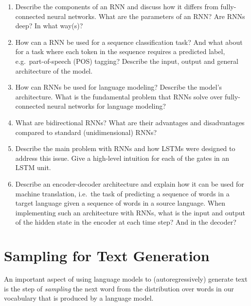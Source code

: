 \documentclass[11pt,a4paper]{article}
\begin{document}
\begin{enumerate}[label=(\alph*)]
    \item Describe the components of an RNN and discuss how it differs from
          fully-connected neural networks. What are the parameters of an RNN?
          Are RNNs deep? In what way(s)?
    \item How can a RNN be used for a sequence classification task? And what
          about for a task where each token in the sequence requires a predicted
          label, e.g.\ part-of-speech (POS) tagging? Describe the input, output
          and general architecture of the model.
    \item How can RNNs be used for language modeling? Describe the model's
          architecture.
          What is the fundamental problem that RNNs solve over fully-connected
          neural networks for language modeling?
    \item What are bidirectional RNNs? What are their advantages and
          disadvantages compared to standard (unidimensional) RNNs?
    \item Describe the main problem with RNNs and how LSTMs were designed to
          address this issue. Give a high-level intuition for each of the gates
          in an LSTM unit.
    \item Describe an encoder-decoder architecture and explain how it can be
          used for machine translation, i.e.\ the task of predicting a sequence
          of words in a target language given a sequence of words in a source
          language.
          When implementing such an architecture with RNNs, what is the input
          and output of the hidden state in the encoder at each time step? And
          in the decoder?
\end{enumerate}

\section{Sampling for Text Generation}

An important aspect of using language models to (autoregressively) generate text
is the step of \emph{sampling} the next word from the distribution over words in
our vocabulary that is produced by a language model.
\end{document}
